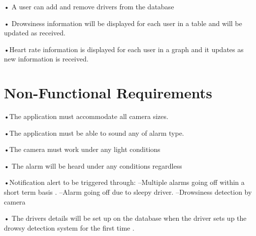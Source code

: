 • A user can add and remove  drivers from the database

• Drowsiness information will be displayed for each user in a table and will be updated as received.

•Heart rate information is displayed for each user in a graph and it updates as new information is received.


\section{Non-Functional Requirements}

•The application must accommodate all camera sizes.

•The application must be able to sound any of alarm type.

•The camera must work under any light conditions

• The alarm will be heard under any conditions regardless

•Notification alert to be triggered through:
         –Multiple alarms going off within a short term basis .
         –Alarm going off due to sleepy driver.
         –Drowsiness detection by camera

• The drivers details will be set up on the database when the driver sets up the drowsy detection system for the first time .







